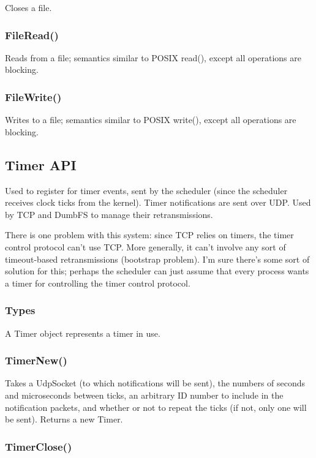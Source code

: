 \documentclass{article}
\begin{document}
Closes a file.

\subsubsection{FileRead()}

Reads from a file; semantics similar to POSIX read(), except all
operations are blocking.

\subsubsection{FileWrite()}

Writes to a file; semantics similar to POSIX write(), except all
operations are blocking.

\subsection{Timer API}

Used to register for timer events, sent by the scheduler (since the
scheduler receives clock ticks from the kernel).  Timer notifications
are sent over UDP.  Used by TCP and DumbFS to manage their
retransmissions.

There is one problem with this system: since TCP relies on timers, the
timer control protocol can't use TCP.  More generally, it can't
involve any sort of timeout-based retransmissions (bootstrap problem).
I'm sure there's some sort of solution for this; perhaps the scheduler
can just assume that every process wants a timer for controlling the
timer control protocol.

\subsubsection{Types}

A Timer object represents a timer in use.

\subsubsection{TimerNew()}

Takes a UdpSocket (to which notifications will be sent), the numbers
of seconds and microseconds between ticks, an arbitrary ID number to
include in the notification packets, and whether or not to repeat the
ticks (if not, only one will be sent).  Returns a new Timer.

\subsubsection{TimerClose()}
\end{document}
